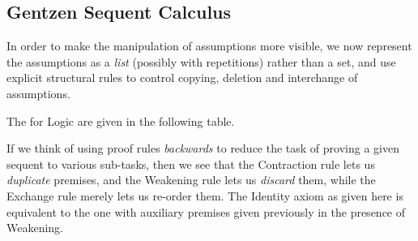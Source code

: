 \documentclass[12pt]{article}
\begin{document}
\subsection{Gentzen Sequent Calculus}
In order to make the manipulation of assumptions more visible, we now represent the assumptions as a \emph{list} (possibly
with repetitions) rather than a set, and use explicit structural rules to control copying, deletion and interchange of assumptions.

\begin{mydefinition}\label{d:Struct} The  for Logic are given in the following table. \deq
\end{mydefinition}

\begin{center}\renewcommand{\arraystretch}{.5}
\end{center}
%
If we think of using proof rules \emph{backwards} to reduce the task of proving a given sequent to various sub-tasks, then we see that the Contraction rule lets us  \emph{duplicate} premises, and the Weakening rule lets us \emph{discard} them, while the Exchange rule merely lets us re-order them.
The Identity axiom as given here is equivalent to the one with auxiliary premises given previously in the presence of Weakening.
\end{document}

